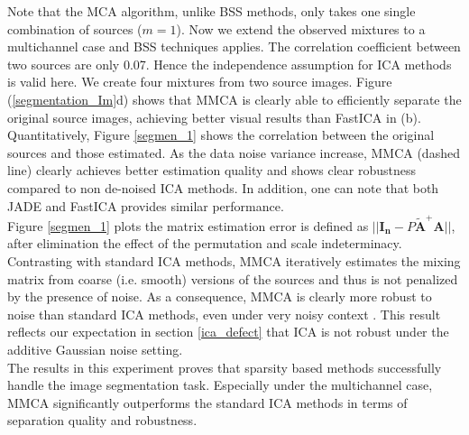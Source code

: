 Note that the MCA algorithm, unlike BSS methods, only takes one single combination of sources ($m = 1$). Now we extend the observed mixtures to a multichannel case and BSS techniques applies. The correlation coefficient between two sources are only 0.07. Hence the independence assumption for ICA methods is valid here. We create four mixtures from two source images.
Figure (\ref{segmentation_Im}d) shows that MMCA is clearly able to efficiently separate the original source images, achieving better visual results than FastICA in (b). Quantitatively, Figure \ref{segmen_1} shows the correlation between the original sources and those estimated. As the data noise variance increase, 
MMCA (dashed line) clearly achieves better estimation quality and shows clear robustness compared to non de-noised ICA methods. In addition, one can note that both JADE and FastICA provides similar performance.\\

Figure \ref{segmen_1} plots the matrix estimation error is defined as $||\mathbf{I_n} - P\tilde{\mathbf{A}}^{+}\mathbf{A} ||$, after elimination the effect of the permutation and scale indeterminacy. Contrasting with standard ICA methods, MMCA iteratively estimates the mixing matrix from coarse (i.e. smooth) versions of the sources and thus is not penalized by the presence of noise. As a consequence, MMCA is clearly more robust to noise than standard ICA methods, even under very noisy context \cite{BobinJ_2006Mdas}. This result reflects our expectation in section \ref{ica_defect} that ICA is not robust under the additive Gaussian noise setting.\\

The results in this experiment proves that sparsity based methods successfully handle the image segmentation task. Especially under the multichannel case, MMCA significantly outperforms the standard ICA methods in terms of separation quality and robustness.\\

